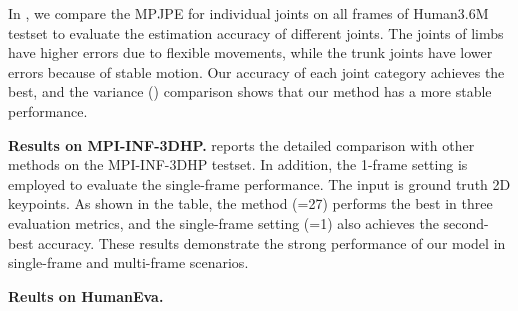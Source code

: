 \documentclass[10pt,twocolumn,letterpaper]{article}
\begin{document}
	In , we compare the MPJPE for individual joints on all frames of Human3.6M testset to evaluate the estimation accuracy of different joints.
	The joints of limbs have higher errors due to flexible movements, while the trunk joints have lower errors because of stable motion.
	Our accuracy of each joint category achieves the best, and the variance () comparison shows that our method has a more stable performance.
	
	\textbf{Results on MPI-INF-3DHP.} 
	 reports the detailed comparison with other methods on the MPI-INF-3DHP testset.
	In addition, the 1-frame setting is employed to evaluate the single-frame performance.
	The input is ground truth 2D keypoints.
	As shown in the table, the method (=27) performs the best in three evaluation metrics, and the single-frame setting (=1) also achieves the second-best accuracy. These results demonstrate the strong performance of our model in single-frame and multi-frame scenarios.
	
	\textbf{Reults on HumanEva.} 
	
\end{document}
